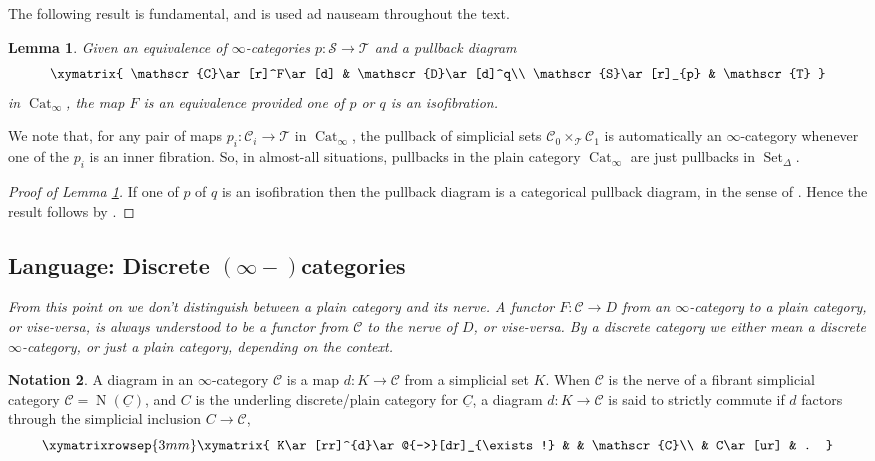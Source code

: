\documentclass[reqno]{amsart}
\newtheorem{lemma}{Lemma}[section]
\theoremstyle{definition}
\newtheorem{notation}[lemma]{Notation}
\newcommand{\msc}[1]{\mathscr{#1}}
\newcommand{\opn}[1]{\operatorname{#1}}
\renewcommand{\1}{\mathbf{1}}
\begin{document}
The following result is fundamental, and is used ad nauseam throughout the text.

\begin{lemma}\label{lem:pullback_equiv}
Given an equivalence of $\infty$-categories $p:\msc{S}\to \msc{T}$ and a pullback diagram
\[
\xymatrix{
\msc{C}\ar[r]^F\ar[d] & \msc{D}\ar[d]^q\\
\msc{S}\ar[r]_{p} & \msc{T}
}
\]
in $\opn{Cat}_{\infty}$, the map $F$ is an equivalence provided one of $p$ or $q$ is an isofibration.
\end{lemma}

We note that, for any pair of maps $p_i:\msc{C}_i\to \msc{T}$ in $\opn{Cat}_{\infty}$, the pullback of simplicial sets $\msc{C}_0\times_{\msc{T}}\msc{C}_1$ is automatically an $\infty$-category whenever one of the $p_i$ is an inner fibration. So, in almost-all situations, pullbacks in the plain category $\opn{Cat}_{\infty}$ are just pullbacks in $\opn{Set}_{\Delta}$.

\begin{proof}[Proof of Lemma \ref{lem:pullback_equiv}]
If one of $p$ of $q$ is an isofibration then the pullback diagram is a categorical pullback diagram, in the sense of \cite[\href{https://kerodon.net/tag/032Y}{032Y}]{kerodon}. Hence the result follows by \cite[\href{https://kerodon.net/tag/033M}{033M}]{kerodon}.
\end{proof}


\subsection{Language: Discrete $(\infty-)$categories}

{\it From this point on we don't distinguish between a plain category and its nerve. A functor $F:\msc{C}\to D$ from an $\infty$-category to a plain category, or vise-versa, is always understood to be a functor from $\msc{C}$ to the nerve of $D$, or vise-versa.  By a \emph{discrete} category we either mean a discrete $\infty$-category, or just a plain category, depending on the context.}

\begin{notation}
A diagram in an $\infty$-category $\msc{C}$ is a map $d:K\to \msc{C}$ from a simplicial set $K$. When $\msc{C}$ is the nerve of a fibrant simplicial category $\msc{C}=\opn{N}(\underline{C})$, and $C$ is the underling discrete/plain category for $\underline{C}$, a diagram $d:K\to \msc{C}$ is said to strictly commute if $d$ factors through the simplicial inclusion $C\to \msc{C}$,
\[
\xymatrixrowsep{3mm}
\xymatrix{
K\ar[rr]^{d}\ar@{-->}[dr]_{\exists!} & & \msc{C}\\
 & C\ar[ur] & .
}
\]
\end{notation}
\end{document}
